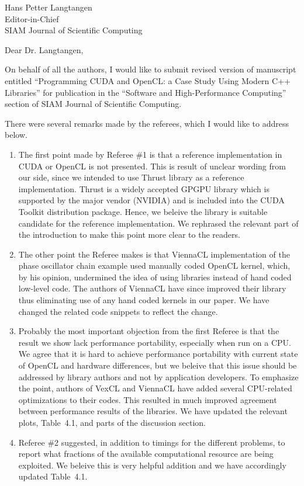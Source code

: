 \documentclass[a4paper,11pt]{letter}
\begin{document}
\begin{letter}{
    Hans Petter Langtangen\\
    Editor-in-Chief\\
    SIAM Journal of Scientific Computing
    }
\opening{Dear Dr. Langtangen,}

On behalf of all the authors, I would like to submit revised version of
manuscript entitled ``Programming CUDA and OpenCL: a Case Study Using Modern
C++ Libraries'' for publication in the ``Software and High-Performance
Computing'' section of SIAM Journal of Scientific Computing.

There were several remarks made by the referees, which I would like to address
below.

\begin{enumerate}
    \item The first point made by Referee \#1 is that a reference
        implementation in CUDA or OpenCL is not presented. This is result of
        unclear wording from our side, since we intended to use Thrust library
        as a reference implementation. Thrust is a widely accepted GPGPU
        library which is supported by the major vendor (NVIDIA) and is included
        into the CUDA Toolkit distribution package. Hence, we beleive the
        library is suitable candidate for the reference implementation. We
        rephrased the relevant part of the introduction to make this point more
        clear to the readers.
    \item The other point the Referee makes is that ViennaCL implementation of
        the phase oscillator chain example used manually coded OpenCL kernel,
        which, by his opinion, undermined the idea of using libraries instead
        of hand coded low-level code. The authors of ViennaCL have since
        improved their library thus eliminating use of any hand coded kernels
        in our paper. We have changed the related code snippets to reflect the
        change.
    \item Probably the most important objection from the first Referee is that
        the result we show lack performance portability, especially when run on
        a CPU. We agree that it is hard to achieve performance portability with
        current state of OpenCL and hardware differences, but we beleive that
        this issue should be addressed by library authors and not by
        application developers. To emphasize the point, authors of
        VexCL and ViennaCL %
        have added several CPU-related optimizations to their codes.
        This resulted in much improved agreement between performance results of
        the libraries. We have updated the relevant plots, Table~4.1, and parts
        of the discussion section.
    \item Referee \#2 suggested, in addition to timings for the different
        problems, to report what fractions of the available computational
        resource are being exploited. We beleive this is very helpful addition
        and we have accordingly updated Table~4.1.
\end{enumerate}


\end{letter}
\end{document}
